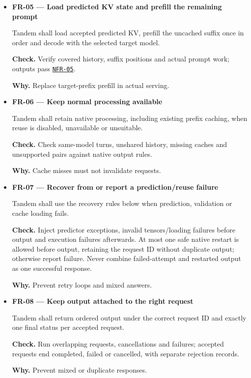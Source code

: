 \documentclass[12pt]{article}
\begin{document}
\begin{itemize}
\item {}\label{req:FR-05}
\textbf{FR-05 --- Load predicted KV state and prefill the remaining prompt}\par
Tandem shall load accepted predicted KV, prefill the uncached suffix once in order and decode with the selected target model.\par
\textbf{Check.} Verify covered history, suffix positions and actual prompt work; outputs pass \hyperref[req:NFR-05]{\texttt{NFR-05}}.\par
\textbf{Why.} Replace target-prefix prefill in actual serving.


\item {}\label{req:FR-06}
\textbf{FR-06 --- Keep normal processing available}\par
Tandem shall retain native processing, including existing prefix caching, when reuse is disabled, unavailable or unsuitable.\par
\textbf{Check.} Check same-model turns, unshared history, missing caches and unsupported pairs against native output rules.\par
\textbf{Why.} Cache misses must not invalidate requests.


\item {}\label{req:FR-07}
\textbf{FR-07 --- Recover from or report a prediction/reuse failure}\par
Tandem shall use the recovery rules below when prediction, validation or cache loading fails.\par
\textbf{Check.} Inject predictor exceptions, invalid tensors/loading failures before output and execution failures afterwards. At most one safe native restart is allowed before output, retaining the request ID without duplicate output; otherwise report failure. Never combine failed-attempt and restarted output as one successful response.\par
\textbf{Why.} Prevent retry loops and mixed answers.


\item {}\label{req:FR-08}
\textbf{FR-08 --- Keep output attached to the right request}\par
Tandem shall return ordered output under the correct request ID and exactly one final status per accepted request.\par
\textbf{Check.} Run overlapping requests, cancellations and failures; accepted requests end completed, failed or cancelled, with separate rejection records.\par
\textbf{Why.} Prevent mixed or duplicate responses.



\end{itemize}
\end{document}
